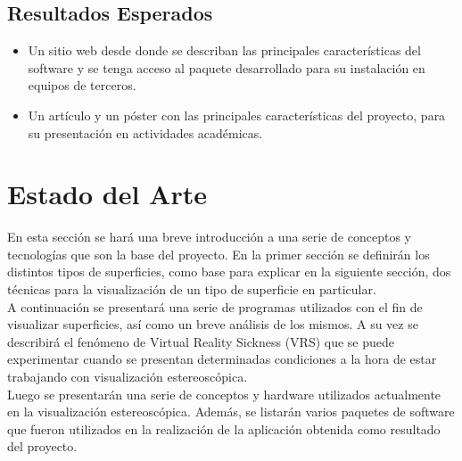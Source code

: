 \documentclass[12pt]{article}
\begin{document}
\subsection{Resultados Esperados}
\begin{itemize}
\item Un sitio web desde donde se describan las principales características del software y se tenga acceso al paquete desarrollado para su instalación en equipos de terceros. 
\item Un artículo y un póster con las principales características del proyecto, para su presentación en actividades académicas.
\end{itemize}
\clearpage
\section{Estado del Arte}
En esta sección se hará una breve introducción a una serie de conceptos y tecnologías que son la base del proyecto. En la primer sección se definirán los distintos tipos de superficies, como base para explicar en la siguiente sección, dos técnicas para la visualización de un tipo de superficie en particular. 
\\A continuación se presentará una serie de programas utilizados con el fin de visualizar superficies, así como un breve análisis de los mismos. A su vez se describirá el fenómeno de Virtual Reality Sickness (VRS) que se puede experimentar cuando se presentan determinadas condiciones a la hora de estar trabajando con visualización estereoscópica.
\\Luego se presentarán una serie de conceptos y hardware utilizados actualmente en la visualización estereoscópica. Además, se listarán varios paquetes de software que fueron utilizados en la realización de la aplicación obtenida como resultado del proyecto.
\end{document}
